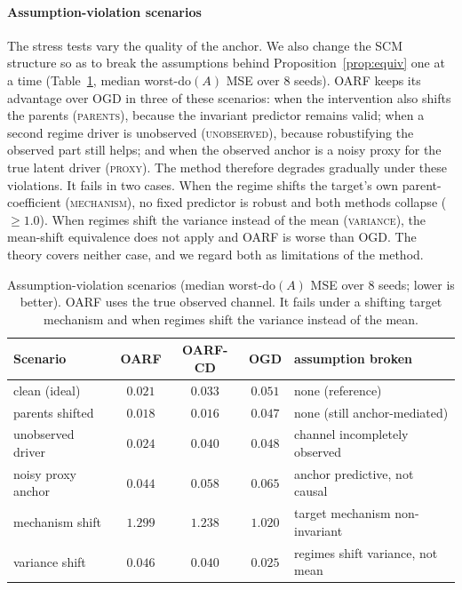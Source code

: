 \documentclass[authoryear,preprint,12pt]{elsarticle}
\theoremstyle{plain}
\theoremstyle{remark}
\newcommand{\doop}{\mathrm{do}}
\newcommand{\OARF}{\textsc{OARF}}
\newcommand{\OARFCD}{\textsc{OARF-CD}}
\begin{document}
\paragraph{Assumption-violation scenarios}
The stress tests vary the quality of the anchor. We also change the SCM structure so as
to break the assumptions behind Proposition~\ref{prop:equiv} one at a time
(Table~\ref{tab:scen}, median worst-$\doop(A)$ MSE over 8 seeds). \OARF{} keeps its
advantage over OGD in three of these scenarios: when the intervention also shifts the
parents (\textsc{parents}), because the invariant predictor remains valid; when a second
regime driver is unobserved (\textsc{unobserved}), because robustifying the observed
part still helps; and when the observed anchor is a noisy proxy for the true latent
driver (\textsc{proxy}). The method therefore degrades gradually under these
violations. It fails in two cases. When the regime shifts the target's own
parent-coefficient (\textsc{mechanism}), no fixed predictor is robust and both methods
collapse ($\ge\!1.0$). When regimes shift the variance instead of the mean
(\textsc{variance}), the mean-shift equivalence does not apply and \OARF{} is worse than
OGD. The theory covers neither case, and we regard both as limitations of the method.

\begin{table}[htbp]
\centering
\caption{Assumption-violation scenarios (median worst-$\doop(A)$ MSE over 8 seeds;
lower is better). \OARF{} uses the true observed channel. It fails under a shifting
target mechanism and when regimes shift the variance instead of the mean.}
\label{tab:scen}
\small
\begin{tabular}{lcccl}
\toprule
Scenario & \OARF{} & \OARFCD{} & OGD & assumption broken\\
\midrule
clean (ideal)      & $0.021$ & $0.033$ & $0.051$ & none (reference)\\
parents shifted    & $0.018$ & $0.016$ & $0.047$ & none (still anchor-mediated)\\
unobserved driver  & $0.024$ & $0.040$ & $0.048$ & channel incompletely observed\\
noisy proxy anchor & $0.044$ & $0.058$ & $0.065$ & anchor predictive, not causal\\
\midrule
mechanism shift    & $1.299$ & $1.238$ & $1.020$ & target mechanism non-invariant\\
variance shift     & $0.046$ & $0.040$ & $0.025$ & regimes shift variance, not mean\\
\bottomrule
\end{tabular}
\end{table}
\end{document}
